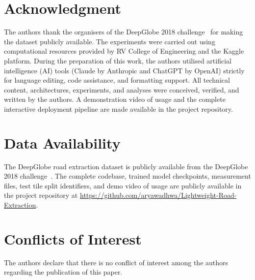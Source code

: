 \documentclass{ieeeaccess}
\begin{document}
\section*{Acknowledgment}

The authors thank the organisers of the DeepGlobe 2018 challenge~\cite{demir2018deepglobe} for making the dataset publicly available. The experiments were carried out using computational resources provided by RV College of Engineering and the Kaggle platform. During the preparation of this work, the authors utilised artificial intelligence (AI) tools (Claude by Anthropic and ChatGPT by OpenAI) strictly for language editing, code assistance, and formatting support. All technical content, architectures, experiments, and analyses were conceived, verified, and written by the authors. A demonstration video of usage and the complete interactive deployment pipeline are made available in the project repository.

\section*{Data Availability}

The DeepGlobe road extraction dataset is publicly available from the DeepGlobe 2018 challenge~\cite{demir2018deepglobe}. The complete codebase, trained model checkpoints, measurement files, test tile split identifiers, and demo video of usage are publicly available in the project repository at \url{https://github.com/aryawadhwa/Lightweight-Road-Extraction}.

\section*{Conflicts of Interest}

The authors declare that there is no conflict of interest among the authors regarding the publication of this paper.
\end{document}
